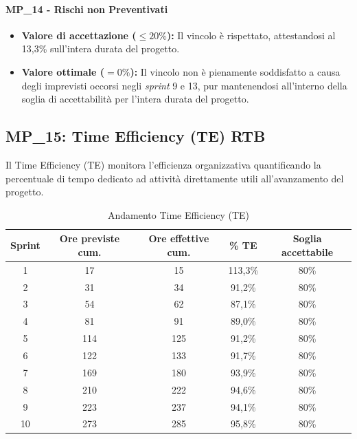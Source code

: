 \documentclass[12pt, a4paper]{article}
\begin{document}
\paragraph*{MP\_14 - Rischi non Preventivati}
\begin{itemize}
\item \textbf{Valore di accettazione ($\le 20\%$):} Il vincolo è rispettato, attestandosi al 13,3\% sull'intera durata del progetto.
\item \textbf{Valore ottimale ($= 0\%$):} Il vincolo non è pienamente soddisfatto a causa degli imprevisti occorsi negli \textit{sprint} 9 e 13, pur mantenendosi all'interno della soglia di accettabilità per l'intera durata del progetto.
\end{itemize}

\subsection{MP\_15: Time Efficiency (TE) RTB}
Il Time Efficiency (TE) monitora l’efficienza organizzativa quantificando la percentuale di tempo dedicato ad attività direttamente utili all’avanzamento del progetto.

\begin{table}[htbp]
    \centering
    \renewcommand{\arraystretch}{1.3}
    \begin{tabular}{|c|c|c|c|c|}
        \hline
        \textbf{Sprint} & \textbf{Ore previste cum.} & \textbf{Ore effettive cum.} & \textbf{\% TE} & \textbf{Soglia accettabile} \\ \hline
        1  & 17  & 15  & 113,3\% & 80\% \\ \hline
        2  & 31  & 34  & 91,2\%  & 80\% \\ \hline
        3  & 54  & 62  & 87,1\%  & 80\% \\ \hline
        4  & 81  & 91  & 89,0\%  & 80\% \\ \hline
        5  & 114 & 125 & 91,2\%  & 80\% \\ \hline
        6  & 122 & 133 & 91,7\%  & 80\% \\ \hline
        7  & 169 & 180 & 93,9\%  & 80\% \\ \hline
        8  & 210 & 222 & 94,6\%  & 80\% \\ \hline
        9  & 223 & 237 & 94,1\%  & 80\% \\ \hline
        10 & 273 & 285 & 95,8\%  & 80\% \\ \hline
    \end{tabular}
    \caption{Andamento Time Efficiency (TE)}
    \label{tab:ore_te_sprint}
\end{table}
\end{document}
